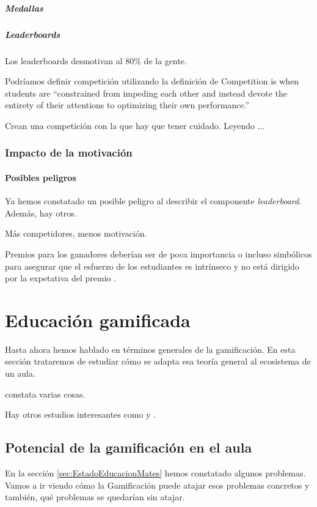 \documentclass[a4paper, 12pt]{book}
\begin{document}
\subparagraph*{Medallas}

\subparagraph*{Leaderboards}

Los leaderboards desmotivan al 80\% de la gente. 

Podríamos definir competición utilizando la definición de \cite{Crawford_CompetitionDef} Competition is when students are “constrained from impeding each other and instead devote the entirety of their attentions to optimizing their own performance.”

Crean una competición con la que hay que tener cuidado. Leyendo \cite{CompetitionInEd}...

\subsubsection{Impacto de la motivación}

\paragraph{Posibles peligros}

Ya hemos constatado un posible peligro al describir el componente \textit{leaderboard}. Además, hay otros.

Más competidores, menos motivación. \cite{n-effect}

Premios para los ganadores deberían ser de poca importancia o incluso simbólicos para asegurar que el esfuerzo de los estudiantes es intrínseco y no está dirigido por la expetativa del premio \cite{CompetitionInEd}.

\section{Educación gamificada}

Hasta ahora hemos hablado en términos generales de la gamificación. 
%
En esta sección trataremos de estudiar cómo se adapta esa teoría general al ecosistema de un aula.

\cite{lee2011gamification} constata varias cosas.

Hay otros estudios interesantes como \cite{Hanus2015152} y \cite{ReviewGamificationInEducation}.

\subsection{Potencial de la gamificación en el aula}

En la sección \ref{sec:EstadoEducacionMates} hemos constatado algunos problemas. 
%
Vamos a ir viendo cómo la Gamificación puede atajar esos problemas concretos y también, qué problemas se quedarían sin atajar.
\end{document}
